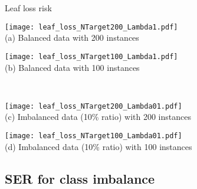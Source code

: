 \begin{frame}{Leaf loss risk}

\renewcommand{\ratio}{0.78}
\renewcommand{\ratiob}{0.45}
    \centering
    \begin{minipage}[t]{0.8\linewidth}\vspace{0pt}
        \centering
        \begin{minipage}[t]{\ratiob\linewidth}\vspace{0pt}
            \centering
            \texttt{[image: leaf\_loss\_NTarget200\_Lambda1.pdf]}\\
            {\small(a)\; Balanced data with 200 instances}
        \end{minipage}\vspace{0.2cm}
        \begin{minipage}[t]{\ratiob\linewidth}\vspace{0pt}
            \centering
            \texttt{[image: leaf\_loss\_NTarget100\_Lambda1.pdf]}\\
            {\small(b)\; Balanced data with 100 instances }
        \end{minipage}
        \\
        \begin{minipage}[t]{\ratiob\linewidth}\vspace{0pt}
            \centering
            \texttt{[image: leaf\_loss\_NTarget200\_Lambda01.pdf]}\\
            {\small (c)\; Imbalanced data (10\% ratio) with 200 instances}
        \end{minipage}
        \centering
        \begin{minipage}[t]{\ratiob\linewidth}\vspace{0pt}
            \centering
            \texttt{[image: leaf\_loss\_NTarget100\_Lambda01.pdf]}\\
            {\small (d)\; Imbalanced data (10\% ratio) with 100 instances}
        \end{minipage}\vspace{0.1cm}
    \end{minipage}

\end{frame}

\subsection{SER for class imbalance}

